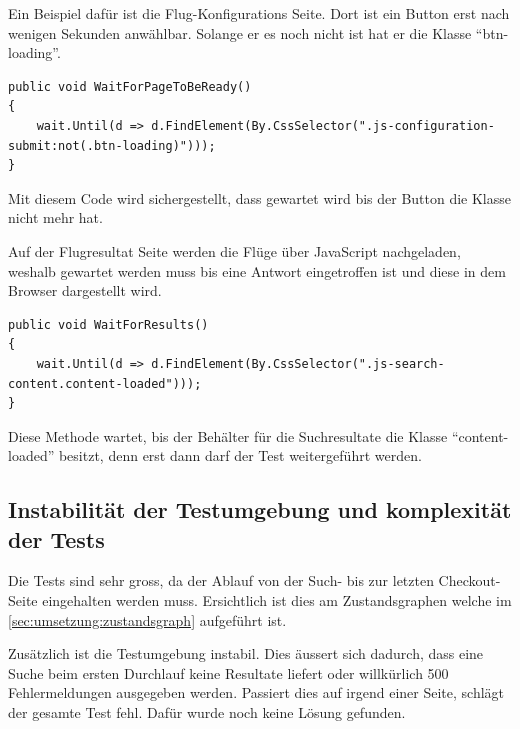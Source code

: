Ein Beispiel dafür ist die Flug-Konfigurations Seite. Dort ist ein Button erst nach wenigen Sekunden anwählbar.
Solange er es noch nicht ist hat er die Klasse "`btn-loading"'. 

\lstset{language=csh}
\begin{lstlisting}
public void WaitForPageToBeReady()
{
    wait.Until(d => d.FindElement(By.CssSelector(".js-configuration-submit:not(.btn-loading)")));
}
\end{lstlisting}

Mit diesem Code wird sichergestellt, dass gewartet wird bis der Button die Klasse nicht mehr hat.

Auf der Flugresultat Seite werden die Flüge über JavaScript nachgeladen, weshalb gewartet werden muss bis eine Antwort eingetroffen ist und diese in dem Browser dargestellt wird.

\begin{lstlisting}
public void WaitForResults()
{
    wait.Until(d => d.FindElement(By.CssSelector(".js-search-content.content-loaded")));
}
\end{lstlisting}

Diese Methode wartet, bis der Behälter für die Suchresultate die Klasse "`content-loaded"' besitzt, denn erst dann darf der Test weitergeführt werden.

\subsection{Instabilität der Testumgebung und komplexität der Tests}
Die Tests sind sehr gross, da der Ablauf von der Such- bis zur letzten Checkout-Seite eingehalten werden muss. Ersichtlich ist dies am Zustandsgraphen welche im \cref{sec:umsetzung:zustandsgraph}  aufgeführt ist.

Zusätzlich ist die Testumgebung instabil. Dies äussert sich dadurch, dass eine Suche beim ersten Durchlauf keine Resultate liefert oder willkürlich 500 Fehlermeldungen ausgegeben werden. Passiert dies auf irgend einer Seite, schlägt der gesamte Test fehl. Dafür wurde noch keine Lösung gefunden.